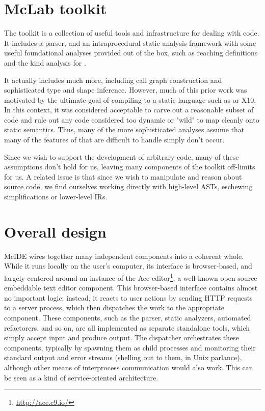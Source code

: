 \section{McLab toolkit}

The \mclab toolkit is a collection of useful tools and infrastructure for
dealing with \matlab code. It includes a \matlab parser, and an intraprocedural
static analysis framework with some useful foundational analyses provided out
of the box, such as reaching definitions and the kind analysis for \matlab
\cite{KindAnalysis}.

It actually includes much more, including call graph construction and
sophisticated type and shape inference. However, much of this prior work was
motivated by the ultimate goal of compiling \matlab to a static language such
as \fortran or X10. In this context, it was considered acceptable to carve out
a reasonable subset of \matlab code and rule out any code considered too
dynamic or "wild" to map cleanly onto static semantics. Thus, many of the more
sophisticated analyses assume that many of the features of \matlab that are
difficult to handle simply don't occur.

Since we wish to support the development of arbitrary \matlab code, many of
these assumptions don't hold for us, leaving many components of the toolkit
off-limits for us. A related issue is that since we wish to manipulate and
reason about \matlab source code, we find ourselves working directly with
high-level ASTs, eschewing simplifications or lower-level IRs.

\section{Overall design}

McIDE wires together many independent components into a coherent whole. While
it runs locally on the user's computer, its interface is browser-based, and
largely centered around an instance of the Ace
editor\footnote{\url{http://ace.c9.io/}}, a well-known open source embeddable
text editor component. This browser-based interface contains almost no
important logic; instead, it reacts to user actions by sending HTTP requests to
a server process, which then dispatches the work to the appropriate component.
These components, such as the parser, static analyzers, automated refactorers,
and so on, are all implemented as separate standalone tools, which simply
accept input and produce output. The dispatcher orchestrates these components,
typically by spawning them as child processes and monitoring their standard
output and error streams (shelling out to them, in Unix parlance), although
other means of interprocess communication would also work. This can be seen as
a kind of service-oriented architecture.

